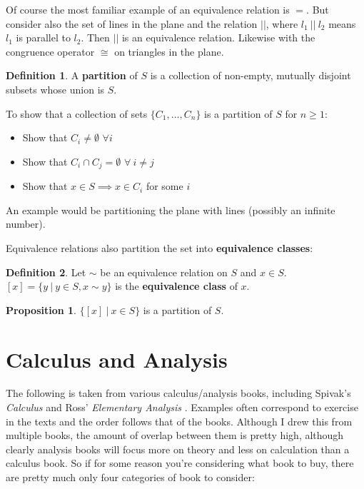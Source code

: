 \documentclass{article}
\theoremstyle{definition}
\newtheorem{definition}{Definition}[section]
\newtheorem{proposition}{Proposition}[section]
\begin{document}
Of course the most familiar example of an equivalence relation is $=$. But consider also the set of lines in the plane and the relation $||$, where $l_1 \ || \ l_2$ means $l_1$ is parallel to $l_2$. Then $||$ is an equivalence relation. Likewise with the congruence operator $\cong$ on triangles in the plane.

\begin{definition}
A \textbf{partition} of $S$ is a collection of non-empty, mutually disjoint subsets whose union is $S$.
\end{definition}

To show that a collection of sets $\{ C_1, \ldots, C_n \}$ is a partition of $S$ for $n \ge 1$:

\begin{itemize}
\item Show that $C_i \neq \emptyset$ $\forall i$
\item Show that $C_i \cap C_j = \emptyset$ $\forall \ i \neq j$
\item Show that $x \in S \implies x \in C_i$ for some $i$
\end{itemize}

An example would be partitioning the plane with lines (possibly an infinite number).

Equivalence relations also partition the set into \textbf{equivalence classes}:

\begin{definition}
Let $\sim$ be an equivalence relation on $S$ and $x \in S$. \\
$[x] = \{ y \ | \ y \in S, x \sim y\}$ is the \textbf{equivalence class} of $x$.
\end{definition}

\begin{proposition}
$\{[x] \ | \ x \in S \}$ is a partition of $S$.
\end{proposition}

\section{Calculus and Analysis}

The following is taken from various calculus/analysis books, including Spivak's {\it Calculus} \cite{spivak} and Ross' {\it Elementary Analysis} \cite{ross}. Examples often correspond to exercise in the texts and the order follows that of the books. Although I drew this from multiple books, the amount of overlap between them is pretty high, although clearly analysis books will focus more on theory and less on calculation than a calculus book. So if for some reason you're considering what book to buy, there are pretty much only four categories of book to consider:
\end{document}
